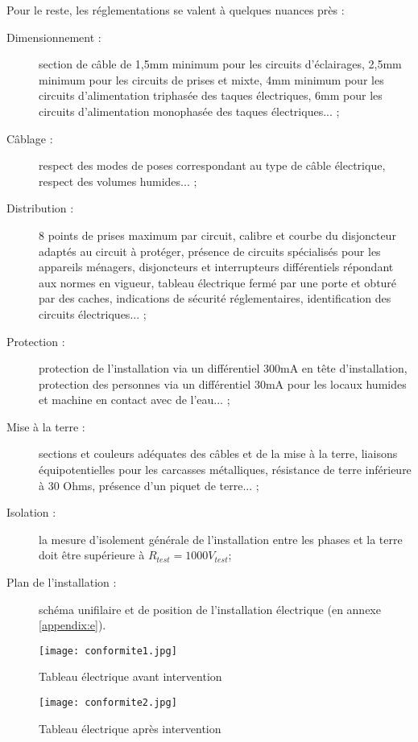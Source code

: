 \documentclass[a4paper, 12pt]{article}
\begin{document}
Pour le reste, les réglementations se valent à quelques nuances près :

\begin{description}

\item[Dimensionnement :] section de câble de 1,5mm minimum pour les circuits d’éclairages, 2,5mm minimum pour les circuits de prises et mixte, 4mm minimum pour les circuits d’alimentation triphasée des taques électriques, 6mm pour les circuits d’alimentation monophasée des taques électriques... ;
\item[Câblage :] respect des modes de poses correspondant au type de câble électrique, respect des volumes humides... ;
\item[Distribution :] 8 points de prises maximum par circuit, calibre et courbe du disjoncteur adaptés au circuit à protéger, présence de circuits spécialisés pour les appareils ménagers, disjoncteurs et interrupteurs différentiels répondant aux normes en vigueur, tableau électrique fermé par une porte et obturé par des caches, indications de sécurité réglementaires, identification des circuits électriques... ;
\item[Protection :] protection de l’installation via un différentiel 300mA en tête d’installation, protection des personnes via un différentiel 30mA pour les locaux humides et machine en contact avec de l’eau... ;
\item[Mise à la terre :] sections et couleurs adéquates des câbles et de la mise à la terre, liaisons équipotentielles pour les carcasses métalliques, résistance de terre inférieure à 30 Ohms, présence d’un piquet de terre... ;
\item[Isolation :] la mesure d’isolement générale de l’installation entre
les phases et la terre doit être supérieure à $R_{test}=1000V_{test}$;
\item[Plan de l’installation :] schéma unifilaire et de position de l’installation électrique (en annexe \ref{appendix:e}).

\end{description}
\begin{figure}[h!]
    \begin{minipage}[t]{.43\linewidth}
        \centering
        \texttt{[image: conformite1.jpg]}
        \caption{Tableau électrique avant intervention}
    \end{minipage}
    \hfill
    \begin{minipage}[t]{.43\linewidth}
        \centering
        \texttt{[image: conformite2.jpg]}
        \caption{Tableau électrique après intervention}
    \end{minipage}
\end{figure}
\end{document}
